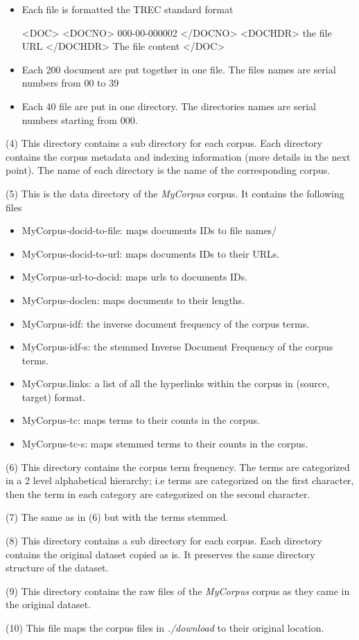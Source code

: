 \begin{itemize}
  \item Each file is formatted the TREC standard format

  \begin{boxedverbatim}
    <DOC>
        <DOCNO> 000-00-000002 </DOCNO>
        <DOCHDR> {the file URL} </DOCHDR>
        {The file content}
    </DOC>
  \end{boxedverbatim}

  \item Each 200 document are put together in one file. The files names are serial numbers from 00 to 39
  \item Each 40 file are put in one directory. The directories names are serial numbers starting from 000.
\end{itemize}

(4) This directory contains a sub directory for each corpus. Each directory contains the corpus metadata and indexing information (more details in the next point). The name of each directory is the name of the corresponding corpus.

(5) This is the data directory of the \emph{MyCorpus} corpus. It contains the following files

\begin{itemize}
  \item MyCorpus-docid-to-file: maps documents IDs to file names/
  \item MyCorpus-docid-to-url: maps documents IDs to their URLs.
  \item MyCorpus-url-to-docid: maps urls to documents IDs.
  \item MyCorpus-doclen: maps documents to their lengths.
  \item MyCorpus-idf: the inverse document frequency of the corpus terms.
  \item MyCorpus-idf-s: the stemmed Inverse Document Frequency of the corpus terms.
  \item MyCorpus.links: a list of all the hyperlinks within the corpus in (source, target) format.
  \item MyCorpus-tc: maps terms to their counts in the corpus.
  \item MyCorpus-tc-s: maps stemmed terms to their counts in the corpus.
\end{itemize}

(6) This directory contains the corpus term frequency. The terms are categorized in a 2 level alphabetical hierarchy; i.e terms are categorized on the first character, then the term in each category are categorized on the second character.

(7) The same as in (6) but with the terms stemmed.

(8) This directory contains a sub directory for each corpus. Each directory contains the original dataset copied as is. It preserves the same directory structure of the dataset.

(9) This directory contains the raw files of the \emph{MyCorpus} corpus as they came in the original dataset.

(10) This file maps the corpus files in \emph{./download} to their original location.
